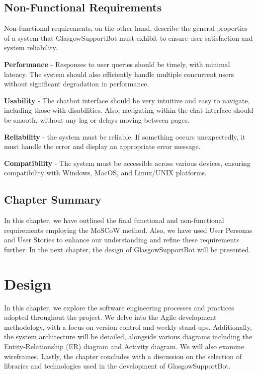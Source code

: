 \documentclass{l4proj}
\begin{document}
\section{Non-Functional Requirements}

Non-functional requirements, on the other hand, describe the general properties of a system that GlasgowSupportBot must exhibit to ensure user satisfaction and system reliability. 

\textbf{Performance} - Responses to user queries should be timely, with minimal latency. The system should also efficiently handle multiple concurrent users without significant degradation in performance.

\textbf{Usability} - The chatbot interface should be very intuitive and easy to navigate, including those with disabilities. Also, navigating within the chat interface should be smooth, without any lag or delays moving between pages.

\textbf{Reliability} - the system must be reliable. If something occurs unexpectedly, it must handle the error and display an appropriate error message.

\textbf{Compatibility} - The system must be accessible across various devices, ensuring compatibility with Windows, MacOS, and Linux/UNIX platforms.

\section{Chapter Summary}

In this chapter, we have outlined the final functional and non-functional requirements employing the MoSCoW method. Also, we have used User Personas and User Stories to enhance our understanding and refine these requirements further. In the next chapter, the design of GlasgowSupportBot will be presented.


\chapter{Design}

In this chapter, we explore the software engineering processes and practices adopted throughout the project. We delve into the Agile development methodology, with a focus on version control and weekly stand-ups. Additionally, the system architecture will be detailed, alongside various diagrams including the Entity-Relationship (ER) diagram and Activity diagram. We will also examine wireframes. Lastly, the chapter concludes with a discussion on the selection of libraries and technologies used in the development of GlasgowSupportBot.
\end{document}
